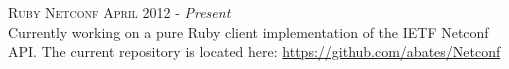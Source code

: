 
\textsc{Ruby Netconf} \hfill \textsc{April 2012} - \emph{Present} \\
Currently working on a pure Ruby client implementation of the IETF Netconf API.
The current repository is located here:
\href{https://github.com/abates/Netconf}{https://github.com/abates/Netconf}
